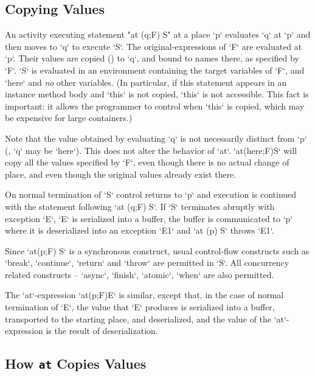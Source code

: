 \subsection{Copying Values}
An activity executing statement \xcd"at (q;F) S" at a place \xcd`p`
evaluates \xcd`q` at \xcd`p` and then moves to \xcd`q` to execute
\xcd`S`.  
The original-expressions of \xcd`F` are evaluated at \xcd`p`.
Their values are copied () to \xcd`q`, and bound to 
names there, as specified by \xcd`F`.  
\xcd`S` is evaluated in an environment containing the target variables of
\xcd`F`, and \xcd`here` and {\em no} other variables.  (In particular, if this
statement appears in an instance method body and \xcd`this` is not copied,
\xcd`this` is not accessible.  This fact is important: it allows the
programmer to control when \xcd`this` is copied, which may be expensive for
large containers.)


Note that the value obtained by evaluating \xcd`q`
is not necessarily distinct from \xcd`p` (\eg, \xcd`q` may be
\xcd`here`). 
This does not alter the behavior of \xcd`at`.  
 \xcd`at(here;F)S` will copy all the values specified by \xcd`F`, 
even though there is no actual change of place, and even though the original
values already exist there.


On normal termination of \xcd`S` control returns to \xcd`p` and
execution is continued with the statement following \xcd`at (q;F) S`. If
\xcd`S` terminates abruptly with exception \xcd`E`, \xcd`E` is
serialized into a buffer, the buffer is communicated to \xcd`p` where
it is deserialized into an exception \xcd`E1` and \xcd`at (p) S`
throws \xcd`E1`.

Since \xcd`at(p;F) S` is a synchronous construct, usual control-flow
constructs such as \xcd`break`, \xcd`continue`, \xcd`return` and 
\xcd`throw` are permitted in \xcd`S`.  All concurrency related
constructs -- \xcd`async`, \xcd`finish`, \xcd`atomic`, \xcd`when` are
also permitted.

The \xcd`at`-expression \xcd`at(p;F)E` is similar, except that, in the case of
normal termination of \xcd`E`, the value that \xcd`E` produces is serialized
into a buffer, transported to the starting place, and deserialized, and the
value of the \xcd`at`-expression is the result of deserialization.




\subsection{How {\tt at} Copies Values}
\label{sect:at-init-val}

